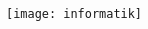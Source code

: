 
\thispagestyle{empty}

\begin{addmargin}[-0.5cm]{0cm}
\centering
  \large

  \hfill

  \vspace{30mm}

  \oTUM{4cm}\\
  \vspace{10mm}
  \spacedallcaps{\faculty} \\
  \textsc{\university} \\ \bigskip

  \vfill

  \textit{\doctype} \\ \bigskip

  \begingroup
    \spacedallcaps{\title} \\ \bigskip
  \endgroup

  \vfill

  \spacedlowsmallcaps{\author}

  \vfill

  \texttt{[image: informatik]} \\ \medskip

\end{addmargin}
